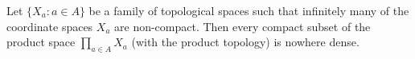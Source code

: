 Let $\{X_a : a \in A\}$ be a family of topological spaces such that infinitely many of the coordinate spaces $X_a$ are non-compact. Then every compact subset of the product space $\prod_{a \in A} X_a$ (with the product topology) is nowhere dense.
